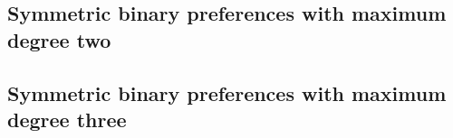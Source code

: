 \subsection{Symmetric binary preferences with maximum degree two}



\subsection{Symmetric binary preferences with maximum degree three}

